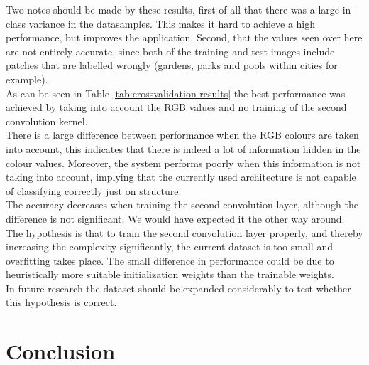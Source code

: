 \documentclass[a4paper,onecolumn]{report}
\begin{document}
Two notes should be made by these results, first of all that there was a large in-class variance in the datasamples. This makes it hard to achieve a high performance, but improves the application. Second, that the values seen over here are not entirely accurate, since both of the training and test images include patches that are labelled wrongly (gardens, parks and pools within cities for example).\\

As can be seen in Table \ref{tab:crossvalidation results} the best performance was achieved by taking into account the RGB values and no training of the second convolution kernel.\\

There is a large difference between performance when the RGB colours are taken into account, this indicates that there is indeed a lot of information hidden in the colour values. Moreover, the system performs poorly when this information is not taking into account, implying that the currently used architecture is not capable of classifying correctly just on structure.\\

The accuracy decreases when training the second convolution layer, although the difference is not significant. We would have expected it the other way around. The hypothesis is that to train the second convolution layer properly, and thereby increasing the complexity significantly, the current dataset is too small and overfitting takes place. The small difference in performance could be due to heuristically more suitable initialization weights than the trainable weights.\\

In future research the dataset should be expanded considerably to test whether this hypothesis is correct. 

\chapter{Conclusion}



\end{document}
